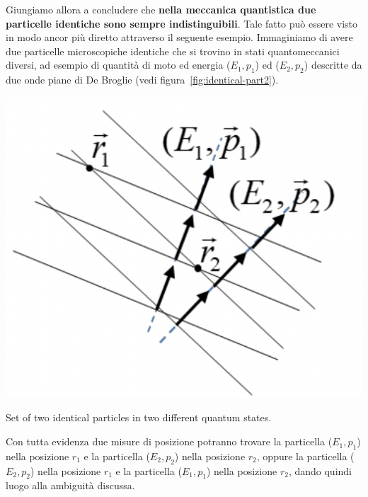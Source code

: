 Giungiamo allora a concludere che \textbf{nella meccanica quantistica
	due particelle identiche sono sempre indistinguibili}.
Tale fatto può
essere visto in modo ancor più diretto attraverso il seguente esempio.
Immaginiamo di avere due particelle microscopiche identiche che
si trovino in stati quantomeccanici diversi, ad esempio di quantità di
moto ed energia (\(E_1, p_1\)) ed (\(E_2, p_2\)) descritte da due onde
piane di De Broglie (vedi figura~\ref{fig:identical-part2}).
\begin{marginfigure}
	\includegraphics{figs/identical-part2}
	    \caption{Set of two identical particles in two different quantum states.}
	\label{fig:identical-part2}
\end{marginfigure}
Con tutta evidenza due misure di posizione potranno trovare la
particella (\(E_{1},p_{1}\)) nella posizione \(r_{1}\) e la particella
(\(E_{2},p_{2}\)) nella posizione \(r_{2}\), oppure la particella
(\(E_{2}, p_{2}\)) nella posizione \(r_{1}\) e la particella
(\(E_{1}, p_{1}\)) nella posizione \(r_{2}\), dando quindi luogo alla
ambiguità discussa.
\bigskip

